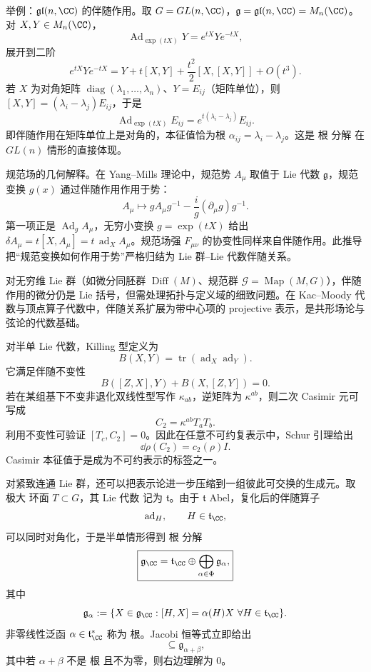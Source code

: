 举例：$\mathfrak{gl}(n,\CC)$ 的伴随作用。取 $G=GL(n,\CC)$，$\mathfrak g=\mathfrak{gl}(n,\CC)=M_n(\CC)$。对 $X,Y\in M_n(\CC)$，
\[
\operatorname{Ad}_{\exp(tX)}Y=e^{tX}Ye^{-tX},
\]
展开到二阶
\[
e^{tX}Ye^{-tX}=Y+t[X,Y]+\frac{t^2}{2}[X,[X,Y]]+O(t^3).
\]
若 $X$ 为对角矩阵 $\operatorname{diag}(\lambda_1,\ldots,\lambda_n)$、$Y=E_{ij}$（矩阵单位），则 $[X,Y]=(\lambda_i-\lambda_j)E_{ij}$，于是
\[
\operatorname{Ad}_{\exp(tX)}E_{ij}=e^{t(\lambda_i-\lambda_j)}E_{ij}.
\]
即伴随作用在矩阵单位上是对角的，本征值恰为根 $\alpha_{ij}=\lambda_i-\lambda_j$。这是 根 分解 在 $GL(n)$ 情形的直接体现。

规范场的几何解释。在 Yang--Mills 理论中，规范势 $A_\mu$ 取值于 Lie 代数 $\mathfrak g$，规范变换 $g(x)$ 通过伴随作用作用于势：
\[
A_\mu\mapsto gA_\mu g^{-1}-\frac{i}{g}(\partial_\mu g)g^{-1}.
\]
第一项正是 $\operatorname{Ad}_g A_\mu$，无穷小变换 $g=\exp(tX)$ 给出 $\delta A_\mu=t[X,A_\mu]=t\,\operatorname{ad}_X A_\mu$。规范场强 $F_{\mu\nu}$ 的协变性同样来自伴随作用。此推导把“规范变换如何作用于势”严格归结为 Lie 群--Lie 代数伴随关系。

对无穷维 Lie 群（如微分同胚群 $\operatorname{Diff}(M)$、规范群 $\mathcal G=\operatorname{Map}(M,G)$），伴随作用的微分仍是 Lie 括号，但需处理拓扑与定义域的细致问题。在 Kac--Moody 代数与顶点算子代数中，伴随关系扩展为带中心项的 projective 表示，是共形场论与弦论的代数基础。

对半单 Lie 代数，Killing 型定义为
\[
B(X,Y)=\operatorname{tr}(\operatorname{ad}_X\operatorname{ad}_Y).
\]
它满足伴随不变性
\[
B([Z,X],Y)+B(X,[Z,Y])=0.
\]
若在某组基下不变非退化双线性型写作 $\kappa_{ab}$，逆矩阵为 $\kappa^{ab}$，则二次 Casimir 元可写成
\begin{equation*}C_2=\kappa^{ab}T_aT_b.\end{equation*}
利用不变性可验证 $[T_c,C_2]=0$。因此在任意不可约复表示中，Schur 引理给出
\[
\dd\rho(C_2)=c_2(\rho)I.
\]
Casimir 本征值于是成为不可约表示的标签之一。

对紧致连通 Lie 群，还可以把表示论进一步压缩到一组彼此可交换的生成元。取 极大 环面 $T\subset G$，其 Lie 代数 记为 $\mathfrak t$。由于 $\mathfrak t$ Abel，复化后的伴随算子
\[
\operatorname{ad}_H,
\qquad H\in\mathfrak t_\CC,
\]
可以同时对角化，于是半单情形得到 根 分解
\begin{equation*}\boxed{
\mathfrak g_\CC
=\mathfrak t_\CC
\oplus
\bigoplus_{\alpha\in\Phi}\mathfrak g_\alpha,
}\end{equation*}
其中
\begin{equation*}\mathfrak g_\alpha
:=\{X\in\mathfrak g_\CC:[H,X]=\alpha(H)X
\ \forall H\in\mathfrak t_\CC\}.\end{equation*}
非零线性泛函 $\alpha\in\mathfrak t_\CC^*$ 称为 根。Jacobi 恒等式立即给出
\begin{equation*}[\mathfrak g_\alpha,\mathfrak g_\beta]
\subseteq\mathfrak g_{\alpha+\beta},\end{equation*}
其中若 $\alpha+\beta$ 不是 根 且不为零，则右边理解为 $0$。

